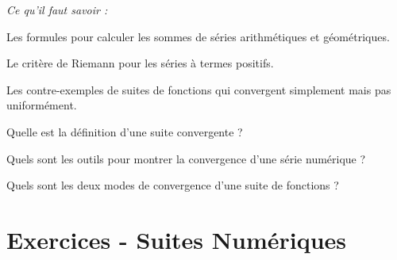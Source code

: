 
\begin{resumeBox}
  \emph{Ce qu'il faut savoir :} 
  \begin{niceitemize}
    \item Les formules pour calculer les sommes de séries arithmétiques et géométriques.
    \item Le critère de Riemann pour les séries à termes positifs.
    \item Les contre-exemples de suites de fonctions qui convergent simplement mais pas uniformément. 
  \end{niceitemize}
\end{resumeBox}
\begin{rappelsBox}
  \begin{niceitemize}
    \item Quelle est la définition d'une suite convergente ?
    \item Quels sont les outils pour montrer la convergence d'une série numérique ? 
    \item Quels sont les deux modes de convergence d'une suite de fonctions ?
  \end{niceitemize}
\end{rappelsBox}

\section*{Exercices - Suites Numériques}

\vspace{1em}


